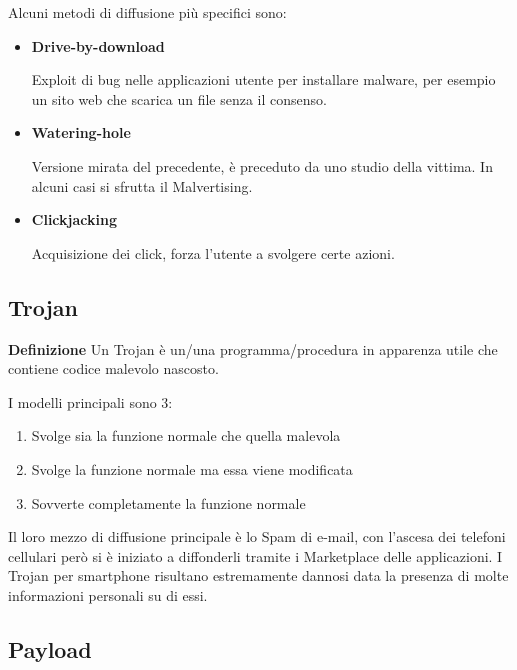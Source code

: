 \documentclass{article}
\newcommand{\df}[1]{\noindent\textbf{Definizione } #1.\newline}
\begin{document}
\noindent Alcuni metodi di diffusione più specifici sono:
\begin{itemize}
    \item \textbf{Drive-by-download}

        Exploit di bug nelle applicazioni utente per installare malware, per esempio un sito web che scarica un file senza il consenso.
    
    \item \textbf{Watering-hole}

        Versione mirata del precedente, è preceduto da uno studio della vittima. In alcuni casi si sfrutta il Malvertising.
    
    \item \textbf{Clickjacking}

        Acquisizione dei click, forza l'utente a svolgere certe azioni.
        
\end{itemize}

\subsection{Trojan}

\df{Un Trojan è un/una programma/procedura in apparenza utile che contiene codice malevolo nascosto}

\noindent I modelli principali sono 3:
\begin{enumerate}
    \item Svolge sia la funzione normale che quella malevola
    \item Svolge la funzione normale ma essa viene modificata
    \item Sovverte completamente la funzione normale\newline
\end{enumerate}

\noindent Il loro mezzo di diffusione principale è lo Spam di e-mail, con l'ascesa dei telefoni cellulari però si è iniziato a diffonderli tramite i Marketplace delle applicazioni. I Trojan per smartphone risultano estremamente dannosi data la presenza di molte informazioni personali su di essi.\newline

\subsection{Payload}
\end{document}
